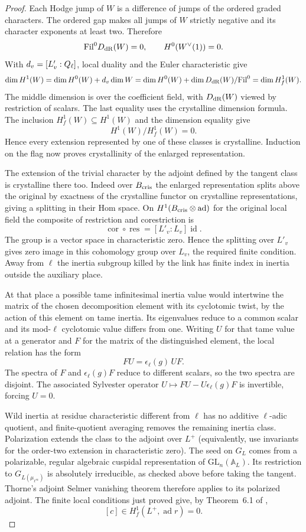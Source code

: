 \begin{proof}
Each Hodge jump of \(W\) is a difference of jumps of the
ordered graded characters. The ordered gap makes all jumps of \(W\) strictly negative
and its character exponents at least two. Therefore
\[
           \mathrm{Fil}^0D_{\rm dR}(W)=0,\qquad
                         H^0(W^\vee(1))=0 .
\]
With \(d_v=[L'_v:Q_\ell]\), local duality and the Euler
characteristic give
\[
 \dim H^1(W)=\dim H^0(W)+d_v\dim W
 =\dim H^0(W)+\dim D_{\rm dR}(W)/\mathrm{Fil}^0
 =\dim H^1_f(W).
\]
The middle dimension is over the coefficient field, with
\(D_{\rm dR}(W)\) viewed by restriction of scalars. The
last equality uses the crystalline dimension formula.
The inclusion \(H^1_f(W)\subseteq H^1(W)\) and the dimension equality give 
\[
 H^1(W)/H^1_f(W)=0.
\]
 Hence every extension represented by one of these classes is crystalline. Induction on the flag now proves crystallinity
of the enlarged representation.

The extension of the trivial
character by the adjoint defined by the tangent class is
crystalline there too. Indeed over \(B_{\rm cris}\) the
enlarged representation splits above the original by
exactness of the crystalline functor on crystalline
representations, giving a splitting in their Hom space.
On \(H^1(B_{\rm cris}\otimes\operatorname{ad})\) for the
original local field the composite of restriction and
corestriction is
\[
                \operatorname{cor}\circ\operatorname{res}
                           =[L'_v:L_v]\operatorname{id}.
\]
The group is a vector space in characteristic zero. Hence the
splitting over \(L'_v\) gives zero image in this cohomology group
over \(L_v\), the required finite condition.
Away from \(\ell\) the inertia subgroup killed by the link
has finite index in inertia outside the auxiliary place.

At that place a possible tame infinitesimal inertia value
would intertwine the matrix of the chosen decomposition
element with its cyclotomic twist, by the action of this
element on tame inertia. Its eigenvalues reduce to a common
scalar and its mod-\(\ell\) cyclotomic value differs from one.
Writing \(U\) for that tame value at a generator and
\(F\) for the matrix of the distinguished element, the
local relation has the form
\[
                   F U=\epsilon_\ell(g)\,U F .
\]
The spectra of \(F\) and \(\epsilon_\ell(g)F\) reduce to
different scalars, so the two spectra are disjoint. The
associated Sylvester operator \(U\mapsto FU-U\epsilon_\ell(g)F\)
is invertible, forcing \(U=0\).

Wild inertia at residue characteristic
different from \(\ell\) has no additive \(\ell\)-adic
quotient, and finite-quotient averaging removes the
remaining inertia class. Polarization extends
the class to the adjoint over \(L^+\) (equivalently,
use invariants for the order-two extension in characteristic
zero). The seed on \(G_L\) comes from a polarizable, regular algebraic
cuspidal representation of \(\mathrm{GL}_n(\mathbb A_L)\). Its
restriction to \(G_{L(\mu_{\ell^\infty})}\) is absolutely irreducible,
as checked above before taking the tangent. Thorne's adjoint Selmer
vanishing theorem therefore applies to its polarized adjoint. The
finite local conditions just proved give, by Theorem~6.1 of \cite{thorne-adjoint},
\[
 [c]\in H^1_f(L^+,\operatorname{ad}r)=0
 .
\]


\end{proof}
